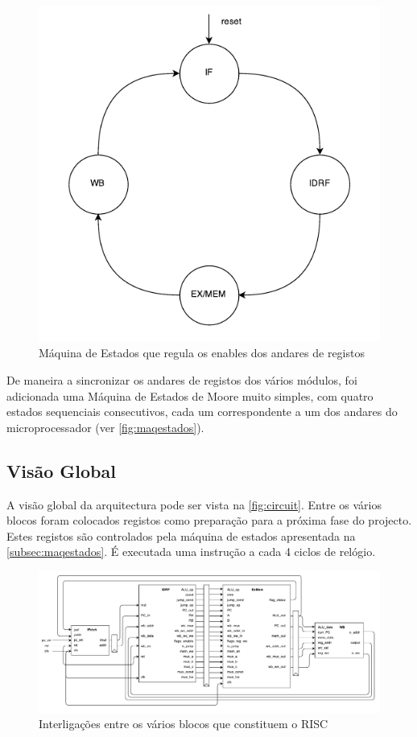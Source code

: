 \documentclass[a4paper]{article}
\begin{document}
			\begin{figure}[H]
				\centering
				\includegraphics[width=.8\textwidth]{img/maqestados}
				\caption{Máquina de Estados que regula os enables dos andares de registos}
				\label{fig:maqestados}
			\end{figure}
		
			De maneira a sincronizar os andares de registos dos vários módulos, foi adicionada uma Máquina de Estados de Moore muito simples, com quatro estados sequenciais consecutivos, cada um correspondente a um dos andares do microprocessador (ver \autoref{fig:maqestados}).
		
		\subsection{Visão Global}
		
				A visão global da arquitectura pode ser vista na \autoref{fig:circuit}. Entre os vários blocos foram colocados registos como preparação para a próxima fase do projecto. Estes registos são controlados pela máquina de estados apresentada na \autoref{subsec:maqestados}. É executada uma instrução a cada 4 ciclos de relógio.
		
		\begin{figure}
				\centering
				\includegraphics[width=1.05\paperwidth]{img/circuit}
				\caption{Interligações entre os vários blocos que constituem o \textmu RISC}
				\label{fig:circuit}
		\end{figure}
		
\end{document}
